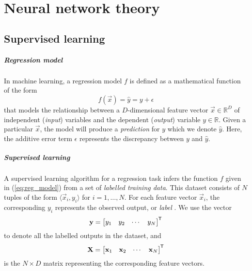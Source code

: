 \chapter{Neural network theory}
\section{Supervised learning}

\paragraph{Regression model}
In machine learning, a regression model $f$ is defined as a mathematical function of the form
\begin{equation}
    \label{eq:reg_model}
    f(\vec{x}) = \hat{y} = y + \epsilon
\end{equation}
that models the relationship between a $D$-dimensional feature vector $\vec{x} \in \mathbb{R}^D$ of independent (\textit{input}) variables and the dependent (\textit{output}) variable $y \in \mathbb{R}$. 
Given a particular $\vec{x}$, the model will produce a \textit{prediction} for $y$ which we denote $\hat{y}$.
Here, the additive error term $\epsilon$ represents the discrepancy between $y$ and $\hat{y}$.

\paragraph{Supervised learning}
A supervised learning algorithm for a regression task infers the function $f$ given in (\ref{eq:reg_model}) from a set of \textit{labelled training data}. This dataset consists of $N$ tuples of the form $\langle \vec{x}_i, y_i\rangle$ for $i=1,\dots,N$.
For each feature vector $\vec{x}_i$, the corresponding $y_i$ represents the observed output, or \textit{label} \cite{burkov2019}.
We use the vector
\begin{equation}
    \mathbf{y} = \begin{bmatrix}
        y_1 & y_2 & \cdots & y_N
    \end{bmatrix}^{\mkern-1.5mu\mathsf{T}}
\end{equation}
to denote all the labelled outputs in the dataset, and
\begin{equation}
    \mathbf{X} = \begin{bmatrix}
        \mathbf{x}_1 & \mathbf{x}_2 & \cdots & \mathbf{x}_N
    \end{bmatrix}^{\mkern-1.5mu\mathsf{T}}
\end{equation}
is the $N \times D$ matrix representing the corresponding feature vectors.

